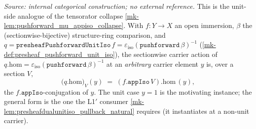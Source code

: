 \begin{lemma}\label{mk-lem:pushforward_beta_unit_eps_app_one}
  \leanok

  \textit{Source: internal categorical construction; no external reference.}
  This is the unit-side analogue of the tensorator collapse
  \ref{mk-lem:pushforward_mu_appiso_collapse}. With \(f : Y \to X\) an open immersion,
  \(\beta\) the (sectionwise-bijective) structure-ring comparison, and
  \(q = \mathtt{presheafPushforwardUnitIso}\,f = \varepsilon_{\mathrm{iso}}(\mathtt{pushforward}\,
  \beta)^{-1}\) (\ref{mk-def:presheaf_pushforward_unit_iso}), the sectionwise carrier action of
  \(q.\mathrm{hom} = \varepsilon_{\mathrm{iso}}(\mathtt{pushforward}\,\beta)^{-1}\) at an
  \emph{arbitrary} carrier element \(y\) is, over a section \(V\),
  \[
    \bigl(q.\mathrm{hom}\bigr)_V (y)
      \;=\; (f.\mathtt{appIso}\,V).\mathrm{hom}\,(y) ,
  \]
  the \(f.\mathtt{appIso}\)-conjugation of \(y\). The unit case \(y = 1\) is the motivating
  instance; the general form is the one the L1\('\) consumer
  \ref{mk-lem:presheafdualunitiso_pullback_natural} requires (it instantiates at a non-unit
  carrier).
\end{lemma}

